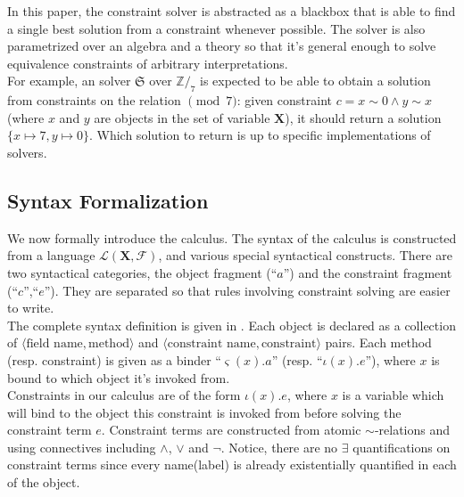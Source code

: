 In this paper, the constraint solver is abstracted as a blackbox that is able to
find a single best solution from a constraint whenever possible. The solver is
also parametrized over an algebra and a theory so that it's general enough to
solve equivalence constraints of arbitrary interpretations.\\

  

For example, an solver $\mathfrak{S}$ over $\mathbb{Z}/_{7}$ is expected to
be able to obtain a solution from constraints on the relation $\pmod{7}$: given
constraint $c = x \sim 0 \land y \sim x$ (where $x$ and $y$ are objects in the
set of variable $\textbf{X}$), it should return a solution $\{ x \mapsto 7 , y
\mapsto 0\}$. Which solution to return is up to specific implementations of
solvers.

\subsection{Syntax Formalization}

We now formally introduce the calculus. The syntax of the calculus is
constructed from a language $\mathcal{L}(\textbf{X},\mathscr{F})$, and various special syntactical
constructs. There are two syntactical categories, the object fragment
(``$a$'') and the constraint fragment (``$c$'',``$e$''). They are separated so that rules
involving constraint solving are easier to write.\\

The complete syntax definition is given in . Each object is
declared as a collection of $\langle \text{field name} , \text{method} \rangle$
and $\langle \text{constraint name} , \text{constraint} \rangle$ pairs. Each
method (resp. constraint) is given as a binder ``$\varsigma(x).a$'' (resp.
``$\iota(x).e$''), where $x$ is bound to which object it's invoked from.\\

Constraints in our calculus are of the form $\iota(x) . e$, where $x$ is a
variable which will bind to the object this constraint is invoked from before
solving the constraint term $e$. Constraint terms are constructed from atomic
$\sim$-relations and using connectives including $\land$, $\vee$ and $\neg$.
Notice, there are no $\exists$ quantifications on constraint terms since every
name(label) is already existentially quantified in each of the object.\\

